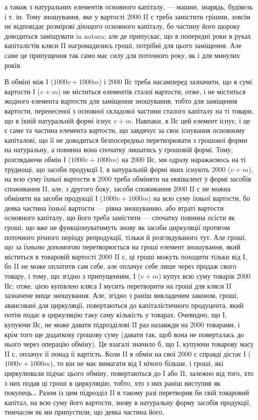 \parcont{}  %
а також з натуральних елементів основного капіталу, — машин,
знарядь, будівель і т. ін. Тому зношування, яке у вартості 2000 II с треба
замістити грішми, зовсім не відповідає розмірові діющого основного
капіталу, бо частину його щороку доводиться заміщувати in natura; але
де припускає, що в попередні роки в руках капіталістів кляси II нагромадились
гроші, потрібні для цього заміщення. Але саме це припущення
так само має силу для поточного року, як і для минулих років.

В обміні між І ($1000 v + 1000 m$) і 2000 ІІс треба насамперед зазначити,
що в сумі вартости І ($v + m$) не міститься елементів сталої
вартости, отже, і не міститься жодного елемента вартости для заміщення
зношування, тобто для заміщення вартости, перенесеної з основної
складової частини сталого капіталу на ті товари, що в їхній натуральній
формі існує $v + m$. Навпаки, в ІІс цей елемент існує, і це є саме та
частина елемента вартости, що завдячує за своє існування основному капіталові,
що її не доводиться безпосередньо перетворювати з грошової
форми на натуральну, а повинна вона спочатку лишатись у грошовій
формі. Тому, розглядаючи обмін І ($1000 v + 1000 m$) на 2000 ІІс, ми
одразу наражаємось на ті труднощі, що засоби продукції І, в натуральній
формі яких існують 2000 ($v + m$), на всю суму їхньої вартости в
2000 треба обміняти на еквівалент у формі засобів споживання II, але,
з другого боку, засоби споживання 2000 II с не можна обміняти на засоби
продукції І ($1000 v + 1000 m$) на всю суму їхньої вартости, бо
деяка частина їхньої вартости — рівна зношуванню, або втраті вартости
основного капіталу, що його треба замістити — спочатку повинна осісти
як гроші, що вже не функціонуватимуть знову як засоби циркуляції
протягом поточного річного періоду репродукції, тільки й розглядуваного
тут. Але гроші, що за їхньою допомогою перетворюється на гроші елемент
зношування, який міститься в товаровій вартості 2000 II с, ці гроші
можуть походити тільки від І, бо II не може оплатити сам себе,
але оплачує себе лише через продаж свого товару, і тому, що згідно
з припущенням, І ($v + m$) купує всю суму товарів 2000 ІІс; отже, цією
купівлею кляса І мусить перетворити на гроші для кляси II зазначене
вище зношування. Але, згідно з раніш викладеним законом, гроші, авансовані
для циркуляції, повертаються до капіталістичного продуцента,
який потім подає в циркуляцію таку саму кількість у товарах. Очевидно,
що І, купуючи ІІс, не може давати підрозділові II раз назавжди на
2000 товарами, і крім того ще додаткову грошову суму (давати так,
щоб вона не поверталась до нього через операцію обміну). Це взагалі
значило б, що І, купуючи товарову масу II с, оплачує її понад ії вартість.
Коли II в обмін на свої 2000 с справді дістає І ($1000 v + 1000 m$),
то він не має вимагати від І нічого більше, і гроші, які циркулювали
підчас цього обміну, повертаються до І або II, залежно від того, хто з
них подав ці гроші в циркуляцію, тобто, хто з них раніш виступив як
покупець\dots{} Разом із цим підрозділ II в такому разі перетворив би свій
товаровий капітал, на всю суму його вартости, знову в натуральну форму
засобів продукції, тимчасом як ми припустили, що деяка частина його,
\parbreak{}  %
